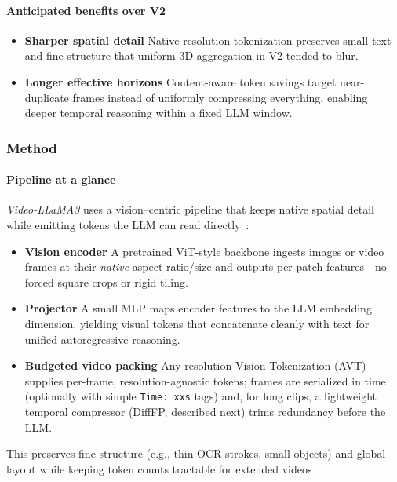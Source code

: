 \begin{enrichment}
\begin{enrichment}
        \paragraph{Anticipated benefits over V2}
        \begin{itemize}
            \item \textbf{Sharper spatial detail} Native\mbox{-}resolution tokenization preserves small text and fine structure that uniform 3D aggregation in V2 tended to blur.
            \item \textbf{Longer effective horizons} Content\mbox{-}aware token savings target near\mbox{-}duplicate frames instead of uniformly compressing everything, enabling deeper temporal reasoning within a fixed LLM window.
        \end{itemize}
        
        \newpage
        
        \subsubsection{Method}
        \label{subsubsec:chapter24_videollama3_method}
        
        \paragraph{Pipeline at a glance}
        \emph{Video\mbox{-}LLaMA3} uses a vision–centric pipeline that keeps native spatial detail while emitting tokens the LLM can read directly~\cite[Sec.~3]{zhang2025_videollama3}:
        \begin{itemize}
            \item \textbf{Vision encoder} A pretrained ViT\mbox{-}style backbone ingests images or video frames at their \emph{native} aspect ratio/size and outputs per\mbox{-}patch features—no forced square crops or rigid tiling.
            \item \textbf{Projector} A small MLP maps encoder features to the LLM embedding dimension, yielding visual tokens that concatenate cleanly with text for unified autoregressive reasoning.
            \item \textbf{Budgeted video packing} Any\mbox{-}resolution Vision Tokenization (AVT) supplies per\mbox{-}frame, resolution\mbox{-}agnostic tokens; frames are serialized in time (optionally with simple \texttt{Time: xxs} tags) and, for long clips, a lightweight temporal compressor (DiffFP, described next) trims redundancy before the LLM.
        \end{itemize}
        This preserves fine structure (e.g., thin OCR strokes, small objects) and global layout while keeping token counts tractable for extended videos~\cite[Sec.~3]{zhang2025_videollama3}.
        

\end{enrichment}
\end{enrichment}
